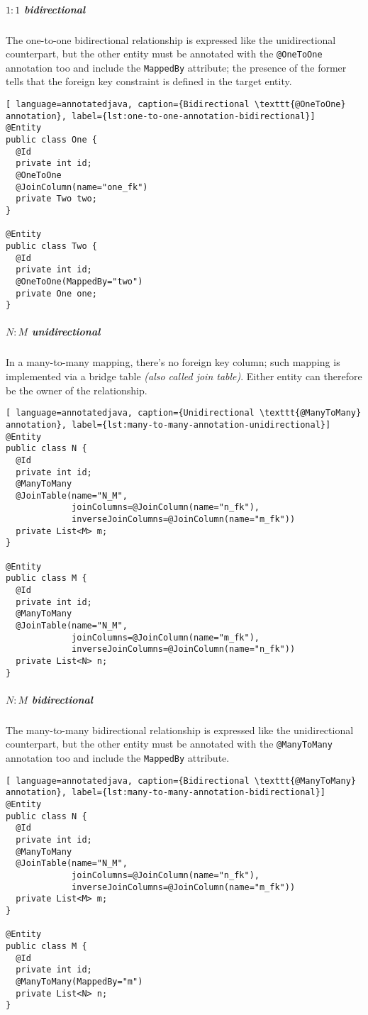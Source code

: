 \documentclass[english]{article}
\begin{document}
\begin{onepage}
  \subparagraph*{\(1:1\) bidirectional}
  The one-to-one bidirectional relationship is expressed like the unidirectional counterpart, but the other entity must be annotated with the \texttt{@OneToOne} annotation too and include the \texttt{MappedBy} attribute;
  the presence of the former tells \jpa that the foreign key constraint is defined in the target entity.

  \begin{lstlisting}[ language=annotatedjava, caption={Bidirectional \texttt{@OneToOne} annotation}, label={lst:one-to-one-annotation-bidirectional}]
@Entity
public class One {
  @Id
  private int id;
  @OneToOne
  @JoinColumn(name="one_fk")
  private Two two;
}

@Entity
public class Two {
  @Id
  private int id;
  @OneToOne(MappedBy="two")
  private One one;
}
\end{lstlisting}
\end{onepage}

\begin{onepage}
  \subparagraph*{\(N:M\) unidirectional}
  In a many-to-many mapping, there's no foreign key column; such mapping is implemented via a bridge table \textit{(also called join table)}.
  Either entity can therefore be the owner of the relationship.

  \begin{lstlisting}[ language=annotatedjava, caption={Unidirectional \texttt{@ManyToMany} annotation}, label={lst:many-to-many-annotation-unidirectional}]
@Entity
public class N {
  @Id
  private int id;
  @ManyToMany
  @JoinTable(name="N_M",
             joinColumns=@JoinColumn(name="n_fk"),
             inverseJoinColumns=@JoinColumn(name="m_fk"))
  private List<M> m;
}

@Entity
public class M {
  @Id
  private int id;
  @ManyToMany
  @JoinTable(name="N_M",
             joinColumns=@JoinColumn(name="m_fk"),
             inverseJoinColumns=@JoinColumn(name="n_fk"))
  private List<N> n;
}
\end{lstlisting}
\end{onepage}

\begin{onepage}
  \subparagraph*{\(N:M\) bidirectional}
  The many-to-many bidirectional relationship is expressed like the unidirectional counterpart, but the other entity must be annotated with the \texttt{@ManyToMany} annotation too and include the \texttt{MappedBy} attribute.

  \begin{lstlisting}[ language=annotatedjava, caption={Bidirectional \texttt{@ManyToMany} annotation}, label={lst:many-to-many-annotation-bidirectional}]
@Entity
public class N {
  @Id
  private int id;
  @ManyToMany
  @JoinTable(name="N_M",
             joinColumns=@JoinColumn(name="n_fk"),
             inverseJoinColumns=@JoinColumn(name="m_fk"))
  private List<M> m;
}

@Entity
public class M {
  @Id
  private int id;
  @ManyToMany(MappedBy="m")
  private List<N> n;
}
\end{lstlisting}
\end{onepage}
\end{document}
